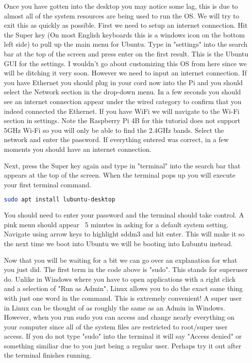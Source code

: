 \documentclass[letterpaper,12pt,notitlepage]{report} %
\begin{document}
Once you have gotten into the desktop you may notice some lag, this is due to almost all of the system resources are being used to run the OS. We will try to exit this as quickly as possible. First we need to setup an internet connection. Hit the Super key (On most English keyboards this is a windows icon on the bottom left side) to pull up the main menu for Ubuntu. Type in "settings" into the search bar at the top of the screen and press enter on the first result. This is the Ubuntu GUI for the settings. I wouldn't go about customizing this OS from here since we will be ditching it very soon. However we need to input an internet connection. If you have Ethernet you should plug in your cord now into the Pi and you should select the Network section in the drop-down menu. In a few seconds you should see an internet connection appear under the wired category to confirm that you indeed connected the Ethernet. If you have WiFi we will navigate to the Wi-Fi section in settings. Note the Raspberry Pi 4B for this tutorial does not support 5GHz Wi-Fi so you will only be able to find the 2.4GHz bands. Select the network and enter the password. If everything entered was correct, in a few moments you should have an internet connection.

Next, press the Super key again and type in "terminal" into the search bar that appears at the top of the screen. When the terminal pops up you will execute your first terminal command. 

\begin{lstlisting}[language=bash]
	sudo apt install lubuntu-desktop
\end{lstlisting}

You should need to enter your password and the terminal should take control. A pink menu should appear ~5 minutes in asking for a default system setting. Navigate using arrow keys to highlight sddm3 and hit enter. This will make it so the next time we boot into Ubuntu we will be booting into Lubuntu instead. 

Now that you will be waiting for a bit we can go over an explanation for what you just did. The first term in the code above is "sudo". This stands for superuser do. Unlike in Windows where you have to open applications with a right click and a selection of "Run as Admin", Linux allows you to do the exact same thing with just one word in the command. This is extremely convenient! A super user in Linux can be thought of as roughly the same as an Admin in Windows. However, when you run sudo you can access and change nearly everything on your computer since all of the system files are restricted to root/super user access. If you do not type "sudo" into the terminal it will say "Access denied" or something similiar due to you just being a regular user. Perhaps try it out after the terminal finishes running.
\end{document}
